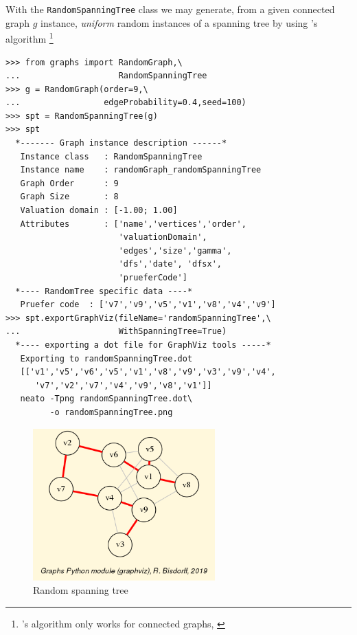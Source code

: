 With the \texttt{RandomSpanningTree} class we may generate, from a given connected graph $g$ instance, \emph{uniform} random instances of a spanning tree by using \Wilson's algorithm \footnote{\Wilson's algorithm only works for connected graphs, \citep{WIL-1996}}
\begin{lstlisting}
>>> from graphs import RandomGraph,\
...                    RandomSpanningTree
>>> g = RandomGraph(order=9,\
...                 edgeProbability=0.4,seed=100)
>>> spt = RandomSpanningTree(g)
>>> spt
  *------- Graph instance description ------*
   Instance class   : RandomSpanningTree
   Instance name    : randomGraph_randomSpanningTree
   Graph Order      : 9
   Graph Size       : 8
   Valuation domain : [-1.00; 1.00]
   Attributes       : ['name','vertices','order',
                       'valuationDomain',
                       'edges','size','gamma',
                       'dfs','date', 'dfsx',
                       'prueferCode']
  *---- RandomTree specific data ----*
   Pruefer code  : ['v7','v9','v5','v1','v8','v4','v9']
>>> spt.exportGraphViz(fileName='randomSpanningTree',\
...                    WithSpanningTree=True)
  *---- exporting a dot file for GraphViz tools -----*
   Exporting to randomSpanningTree.dot
   [['v1','v5','v6','v5','v1','v8','v9','v3','v9','v4',
      'v7','v2','v7','v4','v9','v8','v1']]
   neato -Tpng randomSpanningTree.dot\
         -o randomSpanningTree.png
\end{lstlisting}
\begin{figure}[h]
\sidecaption
\includegraphics[width=7cm]{Figures/randomSpanningTree.png}
\caption{Random spanning tree} 
\label{fig:23.5}       %
\end{figure}


